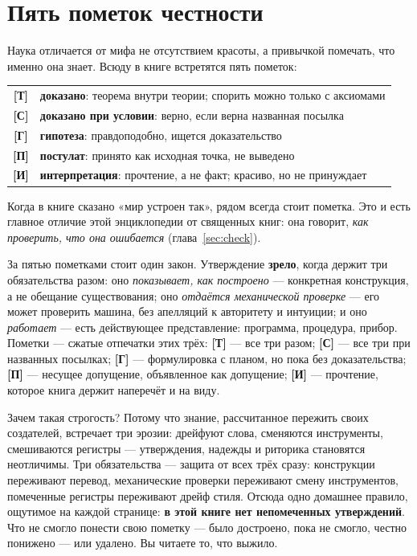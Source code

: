 \documentclass[11pt,letterpaper]{article}
\newcommand{\stT}{\textbf{[Т]}\xspace}
\newcommand{\stC}{\textbf{[С]}\xspace}
\newcommand{\stP}{\textbf{[П]}\xspace}
\newcommand{\stI}{\textbf{[И]}\xspace}
\newcommand{\stH}{\textbf{[Г]}\xspace}
\begin{document}
\tableofcontents
\newpage

\section*{Пять пометок честности}

Наука отличается от мифа не отсутствием красоты, а привычкой помечать,
что именно она знает. Всюду в книге встретятся пять пометок:

\begin{center}
\begin{tabular}{@{}cl@{}}
\toprule
\stT & \textbf{доказано}: теорема внутри теории; спорить можно только с аксиомами \\
\stC & \textbf{доказано при условии}: верно, если верна названная посылка \\
\stH & \textbf{гипотеза}: правдоподобно, ищется доказательство \\
\stP & \textbf{постулат}: принято как исходная точка, не выведено \\
\stI & \textbf{интерпретация}: прочтение, а не факт; красиво, но не принуждает \\
\bottomrule
\end{tabular}
\end{center}

Когда в книге сказано «мир устроен так», рядом всегда стоит пометка.
Это и есть главное отличие этой энциклопедии от священных книг: она
говорит, \emph{как проверить, что она ошибается} (глава~\ref{sec:check}).

За пятью пометками стоит один закон. Утверждение \textbf{зрело},
когда держит три обязательства разом: оно \emph{показывает, как
построено} --- конкретная конструкция, а не обещание существования;
оно \emph{отдаётся механической проверке} --- его может проверить
машина, без апелляций к авторитету и интуиции; и оно
\emph{работает} --- есть действующее представление: программа,
процедура, прибор. Пометки --- сжатые отпечатки этих трёх: \stT{}
--- все три разом; \stC{} --- все три при названных посылках;
\stH{} --- формулировка с планом, но пока без доказательства;
\stP{} --- несущее допущение, объявленное как допущение; \stI{} ---
прочтение, которое книга держит наперечёт и на виду.

Зачем такая строгость? Потому что знание, рассчитанное пережить
своих создателей, встречает три эрозии: дрейфуют слова, сменяются
инструменты, смешиваются регистры --- утверждения, надежды и
риторика становятся неотличимы. Три обязательства --- защита от
всех трёх сразу: конструкции переживают перевод, механические
проверки переживают смену инструментов, помеченные регистры
переживают дрейф стиля. Отсюда одно домашнее правило, ощутимое на
каждой странице: \textbf{в этой книге нет непомеченных
утверждений}. Что не смогло понести свою пометку --- было
достроено, пока не смогло, честно понижено --- или удалено. Вы
читаете то, что выжило.
\end{document}

